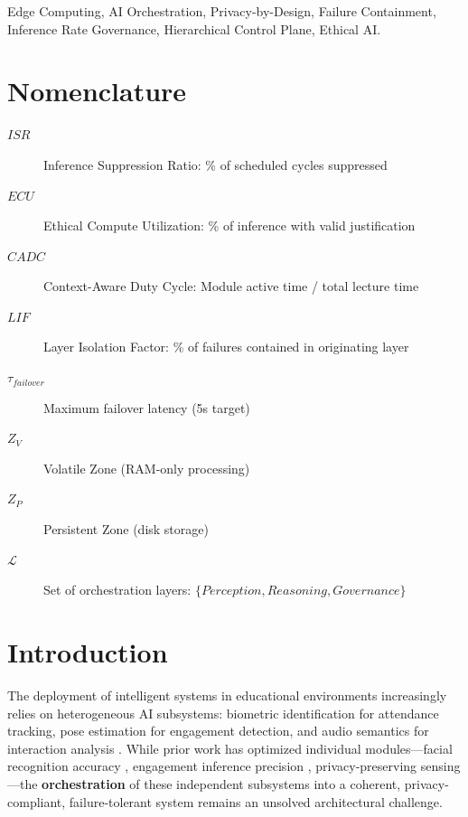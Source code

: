 \documentclass[conference]{IEEEtran}
\begin{document}
\begin{IEEEkeywords}
Edge Computing, AI Orchestration, Privacy-by-Design, Failure Containment, Inference Rate Governance, Hierarchical Control Plane, Ethical AI.
\end{IEEEkeywords}

\section*{Nomenclature}
\begin{description}
    \item[$ISR$] Inference Suppression Ratio: \% of scheduled cycles suppressed
    \item[$ECU$] Ethical Compute Utilization: \% of inference with valid justification
    \item[$CADC$] Context-Aware Duty Cycle: Module active time / total lecture time
    \item[$LIF$] Layer Isolation Factor: \% of failures contained in originating layer
    \item[$\tau_{failover}$] Maximum failover latency (5s target)
    \item[$Z_V$] Volatile Zone (RAM-only processing)
    \item[$Z_P$] Persistent Zone (disk storage)
    \item[$\mathcal{L}$] Set of orchestration layers: $\{Perception, Reasoning, Governance\}$
\end{description}

\section{Introduction}

The deployment of intelligent systems in educational environments increasingly relies on heterogeneous AI subsystems: biometric identification for attendance tracking, pose estimation for engagement detection, and audio semantics for interaction analysis \cite{b18}. While prior work has optimized individual modules—facial recognition accuracy \cite{b1, b12}, engagement inference precision \cite{b2, b13}, privacy-preserving sensing \cite{b3, b14}—the \textbf{orchestration} of these independent subsystems into a coherent, privacy-compliant, failure-tolerant system remains an unsolved architectural challenge.
\end{document}
